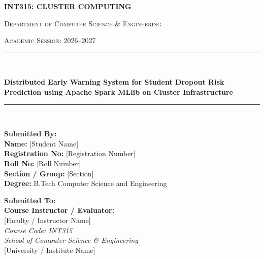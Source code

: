 \documentclass[11pt,a4paper]{article}
\begin{document}
\begin{titlepage}
    \centering
    \vspace*{0.5cm}
    
    {\Huge \bfseries INT315: CLUSTER COMPUTING \par}
    \vspace{0.4cm}
    {\Large \textsc{Department of Computer Science \& Engineering} \par}
    {\large \textsc{Academic Session: 2026--2027} \par}
    
    \vspace{1.2cm}
    \rule{\linewidth}{1.5pt} \\[0.4cm]
    {\huge \bfseries Distributed Early Warning System for Student Dropout Risk Prediction using Apache Spark MLlib on Cluster Infrastructure \par}
    \rule{\linewidth}{1.5pt} \\[1.5cm]
    
    \begin{minipage}[t]{0.48\textwidth}
        \textbf{\large Submitted By:} \\[0.2cm]
        \textbf{Name:} {[Student Name]} \\
        \textbf{Registration No:} {[Registration Number]} \\
        \textbf{Roll No:} {[Roll Number]} \\
        \textbf{Section / Group:} {[Section]} \\
        \textbf{Degree:} B.Tech Computer Science and Engineering
    \end{minipage}
    \hfill
    \begin{minipage}[t]{0.48\textwidth}
        \begin{flushright}
            \textbf{\large Submitted To:} \\[0.2cm]
            \textbf{Course Instructor / Evaluator:} \\[0.1cm]
            {[Faculty / Instructor Name]} \\
            \textit{Course Code: INT315} \\
            \textit{School of Computer Science \& Engineering} \\[0.1cm]
            {[University / Institute Name]}
        \end{flushright}
    \end{minipage}
    

\end{titlepage}
\end{document}
